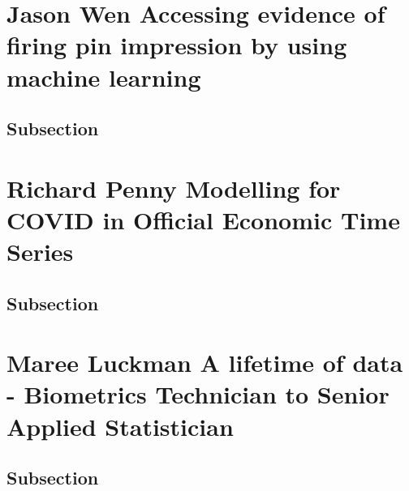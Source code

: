 \documentclass[
]{book}
\begin{document}
\hypertarget{jason-wen-accessing-evidence-of-firing-pin-impression-by-using-machine-learning}{%
\chapter*{Jason Wen \textbar{} Accessing evidence of firing pin impression by using machine learning}\label{jason-wen-accessing-evidence-of-firing-pin-impression-by-using-machine-learning}}

\hypertarget{subsection}{%
\section{Subsection}\label{subsection}}

\hypertarget{richard-penny-modelling-for-covid-in-official-economic-time-series}{%
\chapter*{Richard Penny \textbar{} Modelling for COVID in Official Economic Time Series}\label{richard-penny-modelling-for-covid-in-official-economic-time-series}}

\hypertarget{subsection}{%
\section{Subsection}\label{subsection}}

\hypertarget{maree-luckman-a-lifetime-of-data---biometrics-technician-to-senior-applied-statistician}{%
\chapter*{Maree Luckman \textbar{} A lifetime of data - Biometrics Technician to Senior Applied Statistician}\label{maree-luckman-a-lifetime-of-data---biometrics-technician-to-senior-applied-statistician}}

\hypertarget{subsection}{%
\section{Subsection}\label{subsection}}
\end{document}
